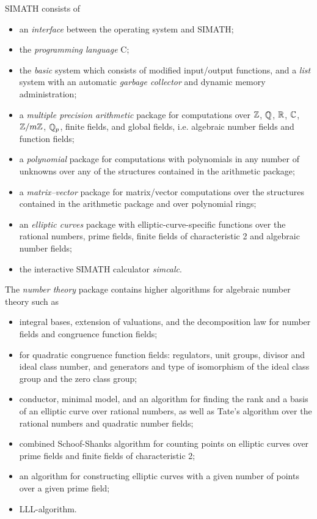 \newpage  \noindent 
SIMATH consists of 
\begin{itemize}
\item an {\em interface\/} between the operating system and SIMATH;
\item the {\em programming language} C;
\item the {\em basic\/} system which consists of 
modified input/output functions, and a {\em list\/} system with an 
automatic {\em garbage collector\/} and dynamic memory administration;
\item a {\em multiple precision arithmetic\/} package for computations over 
$\mbox{$\mathbb Z$}$, $\mbox{$\mathbb Q$}$, $\mbox{$\mathbb R$}$, $\mbox{$\mathbb C$}$, $\mbox{$\mathbb Z$}/m\mbox{$\mathbb Z$}$, $\mbox{$\mathbb Q$}\!\,_p$, finite fields, and global 
fields, i.e. algebraic number fields and function fields;
\item a {\em polynomial\/} package for computations with polynomials in any number
of unknowns over any of the structures contained in the arithmetic package;
\item a {\em matrix--vector\/} package for matrix/vector computations over the structures
contained in the arithmetic package and over polynomial rings;
\item an {\em elliptic curves\/} package with elliptic-curve-specific functions over
the rational numbers, prime fields, finite fields of characteristic 2 and 
algebraic number fields;
\item the interactive SIMATH calculator {\em simcalc\/}.
\end{itemize}
The {\em number theory\/} package contains higher algorithms for algebraic number
theory such as 
\begin{itemize}
\item integral bases, extension of valuations, and the decomposition 
law for number fields and congruence function fields;
\item for quadratic congruence function fields: regulators, unit groups,
divisor and ideal class number, and generators and type of isomorphism of the
ideal class group and the zero class group;
\item conductor, minimal model, and an algorithm for finding the rank and a basis
of an elliptic curve over rational numbers, as well as Tate's algorithm over the
rational numbers and quadratic number fields;
\item combined Schoof-Shanks algorithm for counting points on elliptic curves
over prime fields and finite fields of characteristic 2;
\item an algorithm for constructing elliptic curves with a given number of points
over a given prime field;
\item LLL-algorithm.
\end{itemize}

